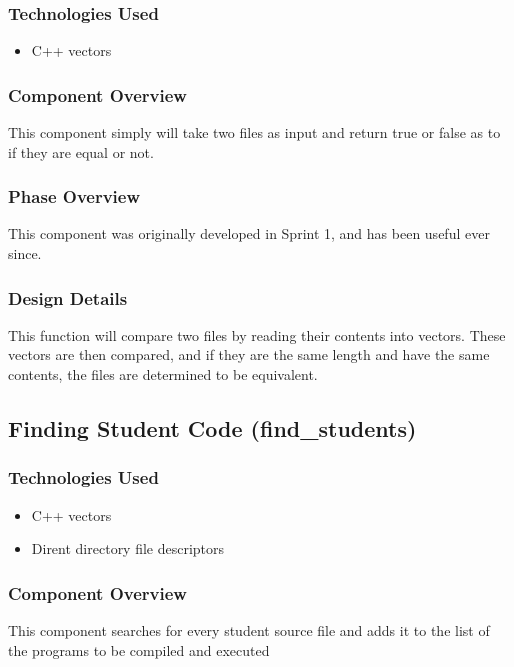 \documentclass {article}
\begin{document}
			\subsubsection{\large{\color{cyan}Technologies Used}}
				 \begin{itemize}
   					\item C++ vectors
				\end{itemize}
				
			\subsubsection{\large{\color{cyan}Component Overview}}
				This component simply will take two files as input and return true or false
				 as to if they are equal or not.
				 
			\subsubsection{\large{\color{cyan}Phase Overview}}
				This component was originally developed in Sprint 1, and has been useful ever
				 since.
				 
			\subsubsection{\large{\color{cyan}Design Details}}
				This function will compare two files by reading their contents into vectors.
				 These vectors are then compared, and if they are the same length and have the
				 same contents, the files are determined to be equivalent.
				 
				 
		\subsection{\Large{\color{blue}Finding Student Code (find\_students)}}

			\subsubsection{\large{\color{cyan}Technologies  Used}}
			\begin{itemize}
				\item C++ vectors
				\item Dirent directory file descriptors
			\end{itemize}

			\subsubsection{\large{\color{cyan}Component Overview}}
				This component searches for every student source file and adds it to the list of
				 the programs to be compiled and executed
\end{document}

